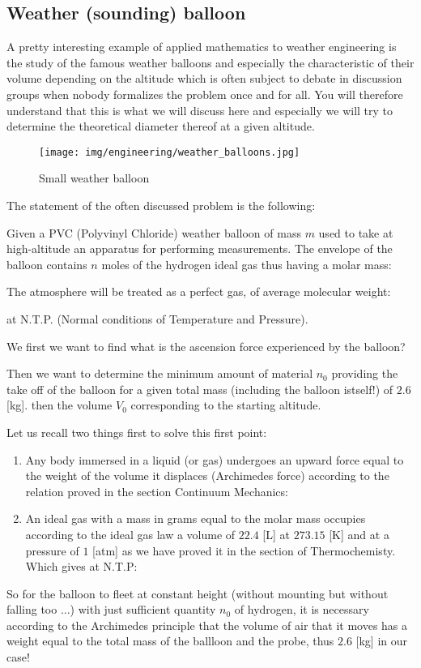 	\subsection{Weather (sounding) balloon}
	A pretty interesting example of applied mathematics to weather engineering is the study of the famous weather balloons and especially the characteristic of their volume depending on the altitude which is often subject to debate in discussion groups when nobody formalizes the problem once and for all. You will therefore understand that this is what we will discuss here and especially we will try to determine the theoretical diameter thereof at a given altitude.
	\begin{figure}[H]
		\begin{center}
			\texttt{[image: img/engineering/weather\_balloons.jpg]}
		\end{center}	
		\caption[]{Small weather balloon}
	\end{figure}
	The statement of the often discussed problem is the following:

	Given a PVC (Polyvinyl Chloride) weather balloon of mass $m$ used to take at high-altitude an apparatus for performing measurements. The envelope of the balloon contains $n$ moles of the hydrogen ideal gas thus having a molar mass:
	
	The atmosphere will be treated as a perfect gas, of average molecular weight:
	
	at N.T.P. (Normal conditions of Temperature and Pressure).

	We first we want to find what is the ascension force experienced by the balloon?

	Then we want to determine the minimum amount of material $n_0$ providing the take off of the balloon for a given total mass (including the balloon istself!) of $2.6$ [kg]. then the volume $V_0$ corresponding to the starting altitude.

	Let us recall two things first to solve this first point:
	\begin{enumerate}
		\item Any body immersed in a liquid (or gas) undergoes an upward force equal to the weight of the volume it displaces (Archimedes force) according to the relation proved in the section Continuum Mechanics:
		

		\item An ideal gas with a mass in grams equal to the molar mass occupies according to the ideal gas law a volume of $22.4$ [L] at $273.15$ [K] and at a pressure of $1$ [atm] as we have proved it in the section of Thermochemisty. Which gives at N.T.P:
		
	\end{enumerate}
	So for the balloon to fleet at constant height (without mounting but without falling too ...) with just sufficient quantity $n_0$ of hydrogen, it is necessary according to the Archimedes principle that the volume of air that it moves has a weight equal to the total mass of the ballloon and the probe, thus $2.6$ [kg] in our case!

